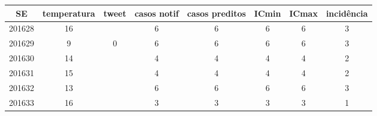 \begin{tabular}{c|ccccccc}
  \hline
SE & temperatura & tweet & casos notif & casos preditos & ICmin & ICmax & incidência \\ 
  \hline
201628 & 16 &  & 6 & 6 & 6 & 6 & 3 \\ 
  201629 & 9 & 0 & 6 & 6 & 6 & 6 & 3 \\ 
  201630 & 14 &  & 4 & 4 & 4 & 4 & 2 \\ 
  201631 & 15 &  & 4 & 4 & 4 & 4 & 2 \\ 
  201632 & 13 &  & 6 & 6 & 6 & 6 & 3 \\ 
  201633 & 16 &  & 3 & 3 & 3 & 3 & 1 \\ 
   \hline
\end{tabular}
